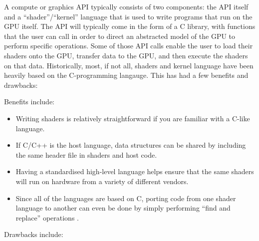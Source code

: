 \documentclass[a4paper,12pt,twoside,openright]{report}
\begin{document}

A compute or graphics API typically consists of two components: the API itself
and a ``shader''/``kernel'' language that is used to write programs that run on
the GPU itself. The API will typically come in the form of a C library, with
functions that the user can call in order to direct an abstracted model of the
GPU to perform specific operations. Some of those API calls enable the user to
load their shaders onto the GPU, transfer data to the GPU, and then execute the
shaders on that data. Historically, most, if not all, shaders and kernel
language have been heavily based on the C-programming langauge. This has had a
few benefits and drawbacks:

Benefits include:

\begin{itemize}

    \item Writing shaders is relatively straightforward if you are familiar with
    a C-like language.

    \item If C/C++ is the host language, data structures can be shared by
    including the same header file in shaders and host code.

    \item Having a standardised high-level language helps ensure that the same
    shaders will run on hardware from a variety of different vendors.

    \item Since all of the languages are based on C, porting code from one
    shader language to another can even be done by simply performing ``find and
    replace'' operations \cite{PS4PortCrew}.

\end{itemize}

Drawbacks include:
\end{document}
